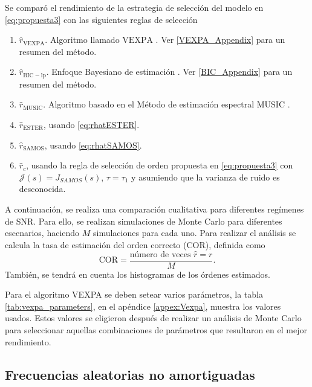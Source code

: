Se comparó el rendimiento de la estrategia de selección del modelo en \eqref{eq:propuesta3} con las siguientes reglas de selección
\begin{enumerate}
	\item $\hat{r}_{\mathrm{VEXPA}}$. Algoritmo llamado $\mathrm{VEXPA}$ \cite{BRIANI2020}. Ver \ref{VEXPA_Appendix} para un resumen del método.
	\item $\hat{r}_{\mathrm{BIC-lp}}$. Enfoque Bayesiano de estimación \cite{Nielsen2013}. Ver \ref{BIC_Appendix} para un resumen del método.
	\item $\hat{r}_{\mathrm{MUSIC}}$. Algoritmo basado en el Método de estimación espectral MUSIC \cite{Christensen2009}.
	\item $\hat{r}_{\mathrm{ESTER}}$, usando \eqref{eq:rhatESTER}.
	\item $\hat{r}_{\mathrm{SAMOS}}$, usando \eqref{eq:rhatSAMOS}.
	\item $\hat{r}_{c}$, usando la regla de selección de orden propuesta en \eqref{eq:propuesta3} con $\mathcal{J}(s) = J_{SAMOS}(s)$, $\tau = \tau_1$ y asumiendo que la varianza de ruido es desconocida.
\end{enumerate}

A continuación, se realiza una comparación cualitativa para diferentes regímenes de SNR. Para ello, se realizan simulaciones de Monte Carlo para diferentes escenarios, haciendo $M$ simulaciones para cada uno. Para realizar el análisis se calcula la tasa de estimación del orden correcto (COR), definida como
\[\mathrm{COR} = \frac{\text{número de veces } \hat{r}=r}{M}.\]
También, se tendrá en cuenta los histogramas de los órdenes estimados.

Para el algoritmo VEXPA se deben setear varios parámetros, la tabla \ref{tab:vexpa_parameters}, en el apéndice \ref{appex:Vexpa}, muestra los valores usados. Estos valores se eligieron después de realizar un análisis de Monte Carlo para seleccionar aquellas combinaciones de parámetros que resultaron en el mejor rendimiento.



\subsection{Frecuencias aleatorias no amortiguadas}

